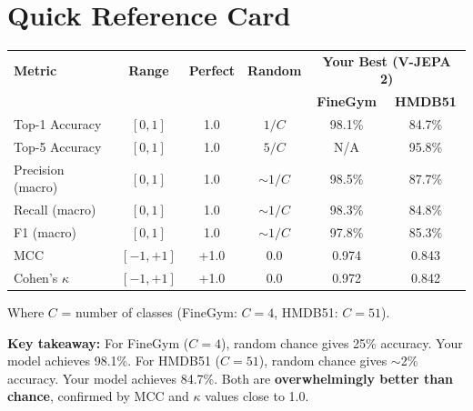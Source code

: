 \documentclass[12pt, a4paper]{article}
\begin{document}
\newpage
\section{Quick Reference Card}

\begin{summarybox}
\begin{center}
\renewcommand{\arraystretch}{1.5}
\begin{tabular}{p{2.8cm}ccccc}
\toprule
\textbf{Metric} & \textbf{Range} & \textbf{Perfect} & \textbf{Random} & \multicolumn{2}{c}{\textbf{Your Best (V-JEPA 2)}} \\
& & & & \textbf{FineGym} & \textbf{HMDB51} \\
\midrule
Top-1 Accuracy & $[0, 1]$ & 1.0 & $1/C$ & 98.1\% & 84.7\% \\
Top-5 Accuracy & $[0, 1]$ & 1.0 & $5/C$ & N/A & 95.8\% \\
Precision (macro) & $[0, 1]$ & 1.0 & $\sim 1/C$ & 98.5\% & 87.7\% \\
Recall (macro) & $[0, 1]$ & 1.0 & $\sim 1/C$ & 98.3\% & 84.8\% \\
F1 (macro) & $[0, 1]$ & 1.0 & $\sim 1/C$ & 97.8\% & 85.3\% \\
MCC & $[-1, +1]$ & +1.0 & 0.0 & 0.974 & 0.843 \\
Cohen's $\kappa$ & $[-1, +1]$ & +1.0 & 0.0 & 0.972 & 0.842 \\
\bottomrule
\end{tabular}
\end{center}

Where $C$ = number of classes (FineGym: $C=4$, HMDB51: $C=51$).

\vspace{0.5cm}
\textbf{Key takeaway:} For FineGym ($C=4$), random chance gives 25\% accuracy. Your model achieves 98.1\%. For HMDB51 ($C=51$), random chance gives $\sim$2\% accuracy. Your model achieves 84.7\%. Both are \textbf{overwhelmingly better than chance}, confirmed by MCC and $\kappa$ values close to 1.0.
\end{summarybox}

\vspace{1cm}

\begin{center}
\end{center}
\end{document}
